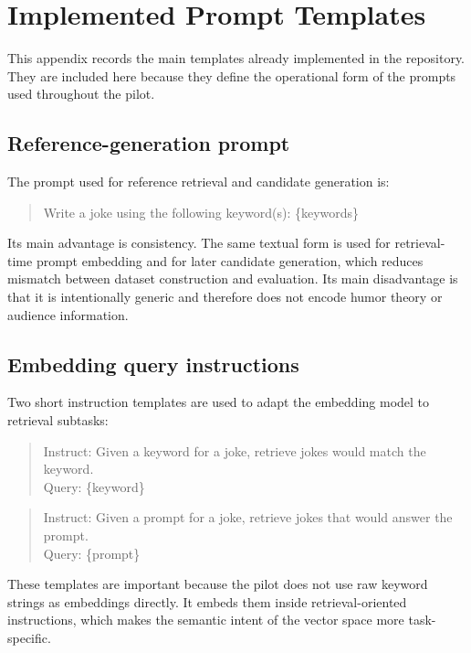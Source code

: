 \documentclass[14pt,a4paper]{extreport}
\begin{document}
\appendix

\chapter{Implemented Prompt Templates}

This appendix records the main templates already implemented in the repository. They are included here because they define the operational form of the prompts used throughout the pilot.

\section{Reference-generation prompt}

The prompt used for reference retrieval and candidate generation is:
\begin{quote}
  \ttfamily
  Write a joke using the following keyword(s): \{keywords\}
\end{quote}

Its main advantage is consistency. The same textual form is used for retrieval-time prompt embedding and for later candidate generation, which reduces mismatch between dataset construction and evaluation. Its main disadvantage is that it is intentionally generic and therefore does not encode humor theory or audience information.

\section{Embedding query instructions}

Two short instruction templates are used to adapt the embedding model to retrieval subtasks:
\begin{quote}
  \ttfamily
  Instruct: Given a keyword for a joke, retrieve jokes would match the keyword.\\
  Query: \{keyword\}
\end{quote}

\begin{quote}
  \ttfamily
  Instruct: Given a prompt for a joke, retrieve jokes that would answer the prompt.\\
  Query: \{prompt\}
\end{quote}

These templates are important because the pilot does not use raw keyword strings as embeddings directly. It embeds them inside retrieval-oriented instructions, which makes the semantic intent of the vector space more task-specific.
\end{document}
